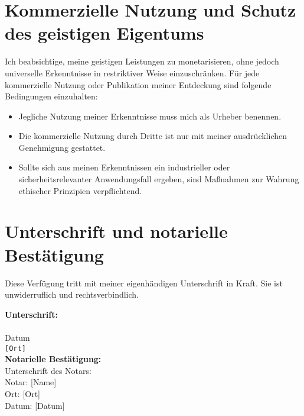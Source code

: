 \documentclass[a4paper,12pt]{article}
\begin{document}
\section{Kommerzielle Nutzung und Schutz des geistigen Eigentums}

Ich beabsichtige, meine geistigen Leistungen zu monetarisieren, ohne jedoch universelle Erkenntnisse in restriktiver Weise einzuschränken.  
Für jede kommerzielle Nutzung oder Publikation meiner Entdeckung sind folgende Bedingungen einzuhalten:
\begin{itemize}
    \item Jegliche Nutzung meiner Erkenntnisse muss mich als Urheber benennen.
    \item Die kommerzielle Nutzung durch Dritte ist nur mit meiner ausdrücklichen Genehmigung gestattet.
    \item Sollte sich aus meinen Erkenntnissen ein industrieller oder sicherheitsrelevanter Anwendungsfall ergeben, sind Maßnahmen zur Wahrung ethischer Prinzipien verpflichtend.
\end{itemize}

\section{Unterschrift und notarielle Bestätigung}

\noindent Diese Verfügung tritt mit meiner eigenhändigen Unterschrift in Kraft. Sie ist unwiderruflich und rechtsverbindlich.

\vspace{1.5cm}
\noindent \textbf{Unterschrift:} \\
\vspace{2cm}
 \\
{Datum} \\
\texttt{[Ort]} \\

\vspace{2cm}
\noindent \textbf{Notarielle Bestätigung:} \\
\vspace{2cm}
\noindent Unterschrift des Notars: \\
\noindent Notar: [Name] \\
\noindent Ort: [Ort] \\
\noindent Datum: [Datum] \\
\end{document}
